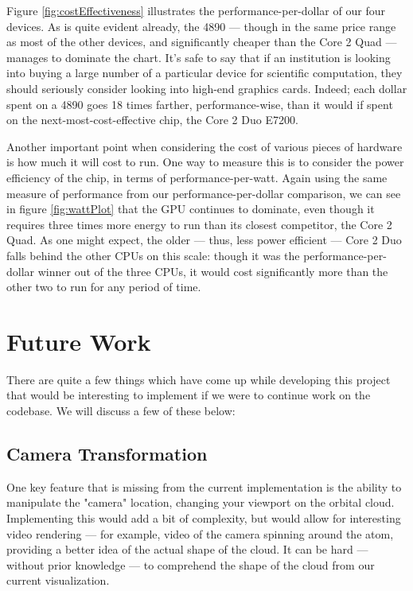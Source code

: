 \documentclass{acmsiggraph}
\begin{document}
Figure \ref{fig:costEffectiveness} illustrates the performance-per-dollar of our four devices. As is quite evident already, the 4890 --- though in the same price range as most of the other devices, and significantly cheaper than the Core 2 Quad --- manages to dominate the chart. It's safe to say that if an institution is looking into buying a large number of a particular device for scientific computation, they should seriously consider looking into high-end graphics cards. Indeed; each dollar spent on a 4890 goes 18 times farther, performance-wise, than it would if spent on the next-most-cost-effective chip, the Core 2 Duo E7200.

Another important point when considering the cost of various pieces of hardware is how much it will cost to run. One way to measure this is to consider the power efficiency of the chip, in terms of performance-per-watt. Again using the same measure of performance from our performance-per-dollar comparison, we can see in figure \ref{fig:wattPlot} that the GPU continues to dominate, even though it requires three times more energy to run than its closest competitor, the Core 2 Quad. As one might expect, the older --- thus, less power efficient --- Core 2 Duo falls behind the other CPUs on this scale: though it was the performance-per-dollar winner out of the three CPUs, it would cost significantly more than the other two to run for any period of time.

\section{Future Work}

There are quite a few things which have come up while developing this project that would be interesting to implement if we were to continue work on the codebase. We will discuss a few of these below:

\subsection{Camera Transformation}

\label{cameraTransformation}

One key feature that is missing from the current implementation is the ability to manipulate the "camera" location, changing your viewport on the orbital cloud. Implementing this would add a bit of complexity, but would allow for interesting video rendering --- for example, video of the camera spinning around the atom, providing a better idea of the actual shape of the cloud. It can be hard --- without prior knowledge --- to comprehend the shape of the cloud from our current visualization.
\end{document}
